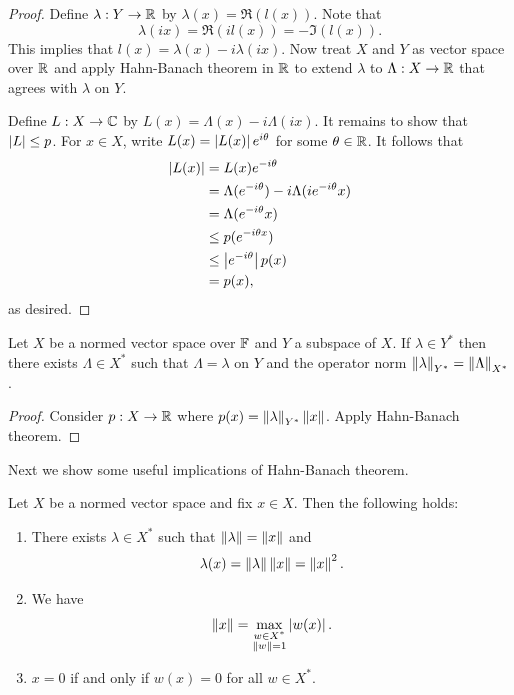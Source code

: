 \documentclass[a4paper]{article}
\begin{document}
\begin{proof}

Define $\lambda: Y \to \mathbb{R}$ by $\lambda(x) = \Re(l(x))$.
Note that 
\[
\lambda(i x) = \Re(i l(x)) = - \Im(l (x)).
\]
This implies that $l(x) = \lambda(x) - i \lambda(i x)$.
Now treat $X$ and $Y$ as vector space over $\mathbb{R}$ and apply Hahn-Banach
theorem in $\mathbb{R}$ to extend $\lambda$ to $\Lambda : X \to \mathbb{R}$
that agrees with $\lambda$ on $Y$. 

Define $L: X \to \mathbb{C}$ by $L(x) = \Lambda(x) - i \Lambda(i x)$.
It remains to show that $\left\lvert L\right\rvert \leq p$. For $x \in X$, 
write $L(x) = \left\lvert L(x)\right\rvert e^{i \theta}$ for some $\theta \in \mathbb{R}$.
It follows that 
\[
\begin{aligned}
  \left\lvert L(x)\right\rvert 
  &= L(x) e^{- i \theta} \\
  &= \Lambda(e^{- i \theta}) - i \Lambda(i e^{- i \theta} x) \\
  &= \Lambda(e^{- i \theta} x) \\
  &\leq p(e^{- i \theta x}) \\ 
  &\leq \left\lvert e^{- i \theta}\right\rvert p(x) \\
  &= p(x),
\end{aligned}
\]
as desired.

\end{proof}

\begin{thm}
Let $X$ be a normed vector space over $\mathbb{F}$ and $Y$ a subspace 
of $X$. If $\lambda \in Y^*$ then there exists 
$\Lambda \in X^*$ such that $\Lambda = \lambda$ on $Y$ and 
the operator norm 
$\left\lVert \lambda\right\rVert_{Y^*} = \left\lVert \Lambda\right\rVert_{X^*}$.
\end{thm}

\begin{proof}
  
Consider $p: X \to \mathbb{R}$ where $p(x) = \left\lVert \lambda\right\rVert_{Y^*} \left\lVert x\right\rVert$.
Apply Hahn-Banach theorem.

\end{proof}

Next we show some useful implications of Hahn-Banach theorem.

\begin{thm}
Let $X$ be a normed vector space and fix $x \in X$. Then 
the following holds: 
\begin{enumerate}
  \item There exists $\lambda \in X^*$ such that 
  $\left\lVert \lambda\right\rVert = \left\lVert x\right\rVert$ and 
  \[
  \lambda(x) = \left\lVert \lambda\right\rVert \left\lVert x\right\rVert = \left\lVert x\right\rVert^2.
  \]
  \item We have 
  \[
  \left\lVert x\right\rVert = \max_{\substack{w \in X^* \\ \left\lVert w\right\rVert = 1}} 
  \left\lvert w(x)\right\rvert.
  \]
  \item $x = 0$ if and only if $w(x) = 0$ for all $w \in X^*$.
\end{enumerate}
\end{thm}
\end{document}
